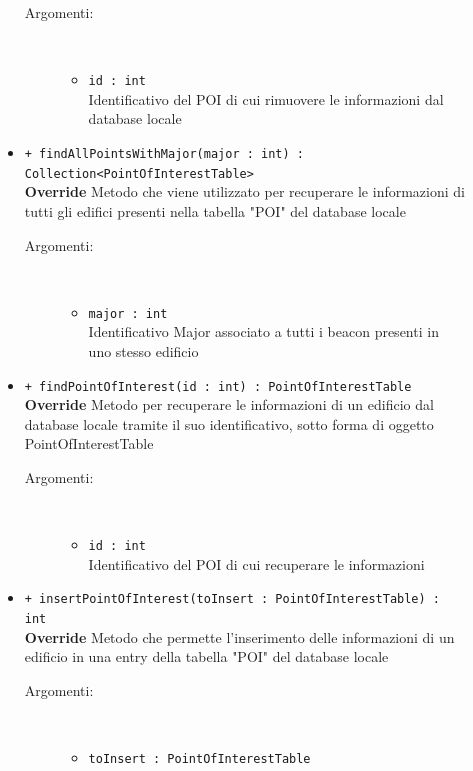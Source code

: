 \documentclass[../DefinizioneDiProdotto.tex]{subfiles}
\begin{document}
\begin{description}
\begin{itemize}
		\begin{description}
			\item[Argomenti:] \
			\begin{itemize}
				\item \texttt{id : int}\\
				Identificativo del POI di cui rimuovere le informazioni dal database locale\end{itemize}
		\end{description}
		\item \texttt{+ findAllPointsWithMajor(major : int) : Collection<PointOfInterestTable>}\\
		\textbf{Override} Metodo che viene utilizzato per recuperare le informazioni di tutti gli edifici presenti nella tabella "POI" del database locale
		\begin{description}
			\item[Argomenti:] \
			\begin{itemize}
				\item \texttt{major : int}\\
				Identificativo Major associato a tutti i beacon presenti in uno stesso edificio\end{itemize}
		\end{description}
		\item \texttt{+ findPointOfInterest(id : int) : PointOfInterestTable}\\
		\textbf{Override} Metodo per recuperare le informazioni di un edificio dal database locale tramite il suo identificativo, sotto forma di oggetto PointOfInterestTable
		\begin{description}
			\item[Argomenti:] \
			\begin{itemize}
				\item \texttt{id : int}\\
				Identificativo del POI di cui recuperare le informazioni\end{itemize}
		\end{description}
		\item \texttt{+ insertPointOfInterest(toInsert : PointOfInterestTable) : int}\\
		\textbf{Override} Metodo che permette l'inserimento delle informazioni di un edificio in una entry della tabella "POI" del database locale
		\begin{description}
			\item[Argomenti:] \
			\begin{itemize}
				\item \texttt{toInsert : PointOfInterestTable}\\

\end{itemize}
\end{description}
\end{itemize}
\end{description}
\end{document}
